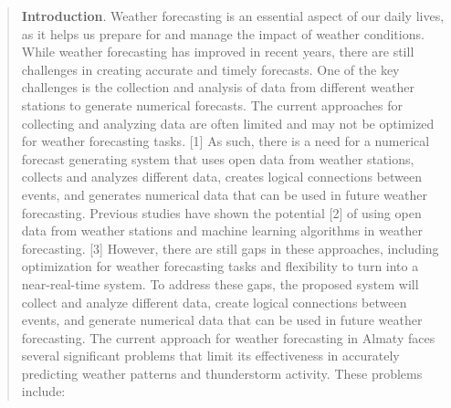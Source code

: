 \begin{quote}
\textbf{Introduction}. Weather forecasting is an essential aspect of our
daily lives, as it helps us prepare for and manage the impact of weather
conditions. While weather forecasting has improved in recent years,
there are still challenges in creating accurate and timely forecasts.
One of the key challenges is the collection and analysis of data from
different weather stations to generate numerical forecasts. The current
approaches for collecting and analyzing data are often limited and may
not be optimized for weather forecasting tasks. {[}1{]} As such, there
is a need for a numerical forecast generating system that uses open data
from weather stations, collects and analyzes different data, creates
logical connections between events, and generates numerical data that
can be used in future weather forecasting. Previous studies have shown
the potential {[}2{]} of using open data from weather stations and
machine learning algorithms in weather forecasting. {[}3{]} However,
there are still gaps in these approaches, including optimization for
weather forecasting tasks and flexibility to turn into a near-real-time
system. To address these gaps, the proposed system will collect and
analyze different data, create logical connections between events, and
generate numerical data that can be used in future weather forecasting.
The current approach for weather forecasting in Almaty faces several
significant problems that limit its effectiveness in accurately
predicting weather patterns and thunderstorm activity. These problems
include:
\end{quote}

